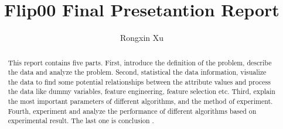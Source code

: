 \documentclass{amsart}
\begin{document}
%
%
\title[Xu's report]{Flip00 Final Presetantion Report}%

\author{Rongxin Xu}
\address[A.~1]{School of Business Administration,\\ 
Hunan University, Changsha 410012, China}%

%
%
\date{\gitAuthorDate}%

\begin{abstract}
This report contains five parts. 
First, 
introduce the definition of the problem,
describe the data and analyze the problem. 
Second, 
statistical the data information, 
visualize the data to find some potential relationships 
between the attribute values 
and process the data 
like dummy variables, feature engineering, feature selection etc. 
Third, 
explain the most important parameters 
of different algorithms,
and the method of experiment.
Fourth,
experiment and 
analyze the performance of different algorithms
based on experimental result.
The last one is conclusion . 
\end{abstract}

\maketitle
\tableofcontents

\newpage



\newpage



\listoftodos
\end{document}

